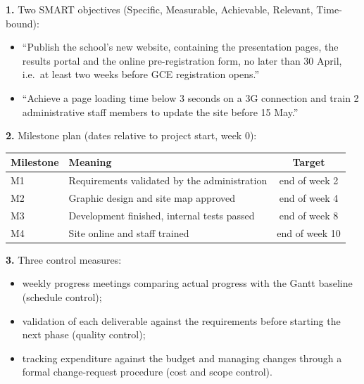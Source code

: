 \documentclass[11pt]{article}
\begin{document}
\begin{corrige}
\textbf{1.} Two SMART objectives (Specific, Measurable, Achievable, Relevant, Time-bound):
\begin{itemize}
\item ``Publish the school's new website, containing the presentation pages, the results portal and the online pre-registration form, no later than 30 April, i.e.\ at least two weeks before GCE registration opens.''
\item ``Achieve a page loading time below 3 seconds on a 3G connection and train 2 administrative staff members to update the site before 15 May.''
\end{itemize}

\textbf{2.} Milestone plan (dates relative to project start, week 0):
\begin{center}
\begin{tabularx}{\linewidth}{|l|X|c|}\hline
\rowcolor{popblueL} \textbf{Milestone} & \textbf{Meaning} & \textbf{Target} \\ \hline
M1 & Requirements validated by the administration & end of week 2 \\ \hline
M2 & Graphic design and site map approved & end of week 4 \\ \hline
M3 & Development finished, internal tests passed & end of week 8 \\ \hline
M4 & Site online and staff trained & end of week 10 \\ \hline
\end{tabularx}
\end{center}

\textbf{3.} Three control measures:
\begin{itemize}
\item weekly progress meetings comparing actual progress with the Gantt baseline (schedule control);
\item validation of each deliverable against the requirements before starting the next phase (quality control);
\item tracking expenditure against the budget and managing changes through a formal change-request procedure (cost and scope control).
\end{itemize}
\end{corrige}
\end{document}
